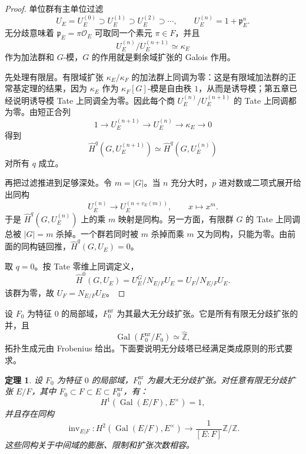 \documentclass[11pt,a4paper,openany]{ctexbook}
\numberwithin{equation}{chapter}
\newcommand{\Z}{\mathbb{Z}}
\newcommand{\Gal}{\operatorname{Gal}}
\theoremstyle{plain}
\newtheorem{theorem}{定理}[chapter]
\theoremstyle{definition}
\theoremstyle{remark}
\begin{document}
\begin{proof}
单位群有主单位过滤
\[
U_E=U_E^{(0)}\supset U_E^{(1)}\supset U_E^{(2)}\supset\cdots,\qquad U_E^{(n)}=1+\mathfrak p_E^n.
\]
无分歧意味着 $\mathfrak p_E=\pi\mathcal O_E$ 可取同一个素元 $\pi\in F$，并且
\[
U_E^{(n)}/U_E^{(n+1)}\simeq \kappa_E
\]
作为加法群和 $G$-模，$G$ 的作用就是剩余域扩张的 Galois 作用。

先处理有限层。有限域扩张 $\kappa_E/\kappa_F$ 的加法群上同调为零：这是有限域加法群的正常基定理的结果，因为 $\kappa_E$ 作为 $\kappa_F[G]$-模是自由秩 $1$，从而是诱导模；第五章已经说明诱导模 Tate 上同调全为零。因此每个商 $U_E^{(n)}/U_E^{(n+1)}$ 的 Tate 上同调都为零。由短正合列
\[
1\longrightarrow U_E^{(n+1)}\longrightarrow U_E^{(n)}
\longrightarrow \kappa_E\longrightarrow0
\]
得到
\[
\widehat H^q(G,U_E^{(n+1)})\simeq \widehat H^q(G,U_E^{(n)})
\]
对所有 $q$ 成立。

再把过滤推进到足够深处。令 $m=|G|$。当 $n$ 充分大时，$p$ 进对数或二项式展开给出同构
\[
U_E^{(n)}\longrightarrow U_E^{(n+v_E(m))},\qquad x\longmapsto x^m.
\]
于是 $\widehat H^q(G,U_E^{(n)})$ 上的乘 $m$ 映射是同构。另一方面，有限群 $G$ 的 Tate 上同调总被 $|G|=m$ 杀掉。一个群若同时被 $m$ 杀掉而乘 $m$ 又为同构，只能为零。由前面的同构链回推，$\widehat H^q(G,U_E)=0$。

取 $q=0$。按 Tate 零维上同调定义，
\[
\widehat H^0(G,U_E)=U_E^G/N_{E/F}U_E=U_F/N_{E/F}U_E.
\]
该群为零，故 $U_F=N_{E/F}U_E$。
\end{proof}

设 $F_0$ 为特征 $0$ 的局部域，$F_0^{\mathrm{nr}}$ 为其最大无分歧扩张。它是所有有限无分歧扩张的并，且
\[
\Gal(F_0^{\mathrm{nr}}/F_0)\simeq \widehat{\Z},
\]
拓扑生成元由 Frobenius 给出。下面要说明无分歧塔已经满足类成原则的形式要求。

\begin{theorem}
设 $F_0$ 为特征 $0$ 的局部域，$F_0^{\mathrm{nr}}$ 为最大无分歧扩张。对任意有限无分歧扩张 $E/F$，其中 $F_0\subset F\subset E\subset F_0^{\mathrm{nr}}$，有：
\[
H^1(\Gal(E/F),E^\times)=1,
\]
并且存在同构
\[
\operatorname{inv}_{E|F}:H^2(\Gal(E/F),E^\times)\longrightarrow \frac1{[E:F]}\Z/\Z.
\]
这些同构关于中间域的膨胀、限制和扩张次数相容。
\end{theorem}
\end{document}
